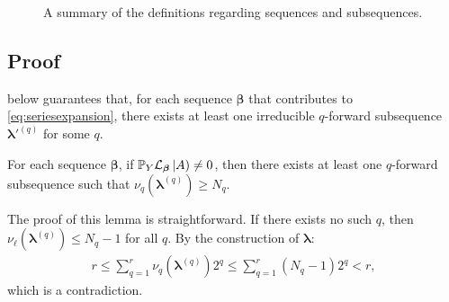 \begin{figure}[h]
\centering
{}
\caption{A summary of the definitions regarding sequences and subsequences.}
\label{fig:def}
\end{figure}

\subsection{Proof}
 below guarantees that, for each sequence $\bm \beta$ that contributes to \cref{eq:seriesexpansion}, there exists at least one irreducible $q$-forward subsequence $\bm \lambda'^{(q)}$ for some $q$.
\begin{lemma}\label{lem:exist-long-q}
	For each sequence $\bm \beta$,
	if $\mathbb{P}_Y \mathcal{L}_{\bm \beta}\left | A \right)\neq 0$, then there exists at least one $q$-forward subsequence such that $\nu_q(\bm \lambda^{(q)})\geq N_q$.
\end{lemma}
The proof of this lemma is straightforward. If there exists no such $q$, then $\nu_\ell(\bm\lambda^{(q)})\leq N_q-1$ for all $q$.
By the construction of $\bm \lambda$:
\begin{align}
	r \leq \sum_{q = 1}^r \nu_q(\bm\lambda^{(q)}) 2^q
	\leq \sum_{q = 1}^r (N_q-1) 2^q<r,
\end{align}
which is a contradiction.


